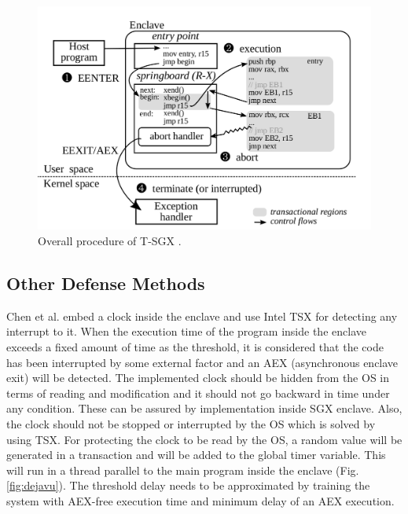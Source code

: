 \begin{figure}
	\includegraphics[scale=0.2]{images/tsgx2}
	\caption{Overall procedure of T-SGX \cite{tsgx}.}
	\label{fig:tsgx2}
\end{figure}

\subsection{Other Defense Methods}
Chen et al. \cite{dejavu} embed a clock inside the enclave and use Intel TSX for detecting any interrupt to it. When the execution time of the program inside the enclave exceeds a fixed amount of time as the threshold, it is considered that the code has been interrupted by some external factor and an AEX (asynchronous enclave exit) will be detected. The implemented clock should be hidden from the OS in terms of reading and modification and it should not go backward in time under any condition. These can be assured by implementation inside SGX enclave. Also, the clock should not be stopped or interrupted by the OS which is solved by using TSX. For protecting the clock to be read by the OS, a random value will be generated in a transaction and will be added to the global timer variable. This will run in a thread parallel to the main program inside the enclave (Fig. \ref{fig:dejavu}). The threshold delay needs to be approximated by training the system with AEX-free execution time and minimum delay of an AEX execution.

